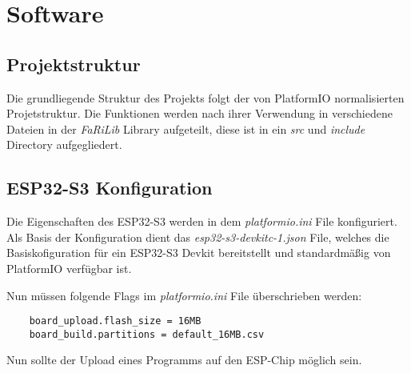 \chapter{Software}

    \section{Projektstruktur}
    Die grundliegende Struktur des Projekts folgt der von PlatformIO 
    normalisierten Projetstruktur. Die Funktionen werden nach ihrer
    Verwendung in verschiedene Dateien in der \textit{FaRiLib} Library
    aufgeteilt, diese ist in ein \textit{src} und \textit{include} 
    Directory aufgegliedert.

    \section{ESP32-S3 Konfiguration}
    Die Eigenschaften des ESP32-S3 werden in dem \textit{platformio.ini}
    File konfiguriert. Als Basis der Konfiguration dient
    das \textit{esp32-s3-devkitc-1.json} File, welches die
    Basiskofiguration für ein ESP32-S3 Devkit bereitstellt
    und standardmäßig von PlatformIO verfügbar ist. \par
    
    Nun müssen folgende Flags im \textit{platformio.ini} File
    überschrieben werden:

    \begin{lstlisting}
    board_upload.flash_size = 16MB
    board_build.partitions = default_16MB.csv
    \end{lstlisting}

    Nun sollte der Upload eines Programms auf den 
    ESP-Chip möglich sein.

    
    



